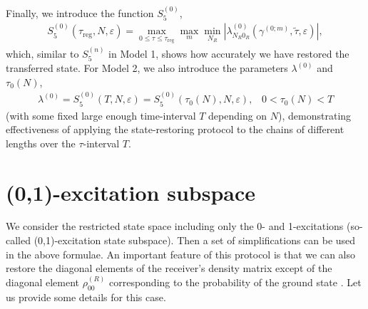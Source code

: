\documentclass[pra,preprint,showpacs]{revtex4-1}
\begin{document}
{{Finally,  we introduce the function $S^{(0)}_5$,
\begin{eqnarray}\label{2S5}
S^{(0)}_5(\tau_{\mathrm{reg}},N,\varepsilon) = \max_{0\le\tau\le \tau_{\mathrm{reg}}} \max_{m} \min_{N_R} \left| \lambda^{(0)}_{N_R0_R} (\gamma^{(0;m)},\tilde\tau,\varepsilon)\right|,
\end{eqnarray}
which, similar to $S^{(n)}_5$ in Model 1,  shows  how accurately we have restored the transferred state.
 For  Model 2,  we also introduce the parameters  $\lambda^{(0)}$ and $\tau_0(N)$,
 \begin{eqnarray}\label{lam02}
\lambda^{(0)}= S^{(0)}_5(T,N,\varepsilon) = S^{(0)}_5(\tau_0(N) ,N,\varepsilon), \;\;\;0<\tau_0(N)< T
 \end{eqnarray}
(with some fixed large enough time-interval $T$ depending on $N$), demonstrating effectiveness of  applying the state-restoring protocol to the chains of different lengths over the $\tau$-interval $T$.

\section{(0,1)-excitation subspace}
\label{Section:examples}
We consider the restricted state space including only the 0- and 1-excitations (so-called (0,1)-excitation state subspace). Then a set of simplifications can be used  in the above formulae. An important feature of this protocol is that we can also restore the diagonal elements of the receiver's density matrix except of the diagonal element $\rho^{(R)}_{00}$ corresponding to the probability of the ground state \cite{TZarxiv}. Let us provide some details for this case.

}}
\end{document}
